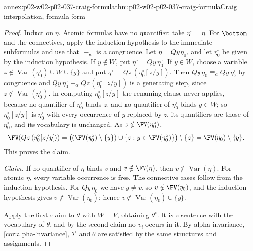 \begin{annexitem}{annex:p02-w02-p02-037-craig-formula}{thm:p02-w02-p02-037-craig-formula}{Craig interpolation, formula form}
\begin{proof}
Induct on \(\eta\).  Atomic formulas have no quantifier; take
\(\eta^{\circ}=\eta\).  For \(\bottom\) and the connectives, apply the
induction hypothesis to the immediate subformulas and use that
\(\equiv_\alpha\) is a congruence.  Let \(\eta=Qy\,\eta_0\), and let
\(\eta_0^{\circ}\) be given by the induction hypothesis.  If
\(y\notin W\), put \(\eta^{\circ}=Qy\,\eta_0^{\circ}\).  If \(y\in W\),
choose a variable \(z\notin\operatorname{Var}(\eta_0^{\circ})\cup W\cup\{y\}\)
and put \(\eta^{\circ}=Qz\,(\eta_0^{\circ}[z/y])\).  Then
\(Qy\,\eta_0\equiv_\alpha Qy\,\eta_0^{\circ}\) by congruence and
\(Qy\,\eta_0^{\circ}\equiv_\alpha Qz\,(\eta_0^{\circ}[z/y])\) is a generating
step, since \(z\notin\operatorname{Var}(\eta_0^{\circ})\).  In computing
\(\eta_0^{\circ}[z/y]\) the renaming clause never applies, because no
quantifier of \(\eta_0^{\circ}\) binds \(z\), and no quantifier of
\(\eta_0^{\circ}\) binds \(y\in W\); so \(\eta_0^{\circ}[z/y]\) is
\(\eta_0^{\circ}\) with every occurrence of \(y\) replaced by \(z\), its
quantifiers are those of \(\eta_0^{\circ}\), and its vocabulary is
unchanged.  As \(z\notin\FV(\eta_0^{\circ})\),
\[
 \FV(Qz\,(\eta_0^{\circ}[z/y]))
 =\bigl((\FV(\eta_0^{\circ})\setminus\{y\})\cup
   \{z: y\in\FV(\eta_0^{\circ})\}\bigr)\setminus\{z\}
 =\FV(\eta_0)\setminus\{y\}.
\]
This proves the claim.

\emph{Claim.}  If no quantifier of \(\eta\) binds \(v\) and
\(v\notin\FV(\eta)\), then \(v\notin\operatorname{Var}(\eta)\).  For atomic
\(\eta\), every variable occurrence is free.  The connective cases follow
from the induction hypothesis.  For \(Qy\,\eta_0\) we have \(y\neq v\), so
\(v\notin\FV(\eta_0)\), and the induction hypothesis gives
\(v\notin\operatorname{Var}(\eta_0)\); hence
\(v\notin\operatorname{Var}(\eta_0)\cup\{y\}\).

Apply the first claim to \(\theta\) with \(W=V\), obtaining
\(\theta^{\circ}\).  It is a sentence with the vocabulary of \(\theta\), and
by the second claim no \(v_i\) occurs in it.  By alpha-invariance,
\cref{cor:alpha-invariance}, \(\theta^{\circ}\) and \(\theta\) are satisfied
by the same structures and assignments.


\end{proof}
\end{annexitem}
